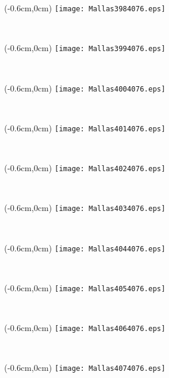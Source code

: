 \documentclass[12pt,letterpaper,oneside]{report}
\begin{document}
\begin{textblock*}{\paperwidth}(-0.6cm,0cm)
\texttt{[image: Mallas3984076.eps]}
\end{textblock*}

\ \pagebreak
\begin{textblock*}{\paperwidth}(-0.6cm,0cm)
\texttt{[image: Mallas3994076.eps]}
\end{textblock*}

\ \pagebreak
\begin{textblock*}{\paperwidth}(-0.6cm,0cm)
\texttt{[image: Mallas4004076.eps]}
\end{textblock*}

\ \pagebreak
\begin{textblock*}{\paperwidth}(-0.6cm,0cm)
\texttt{[image: Mallas4014076.eps]}
\end{textblock*}

\ \pagebreak
\begin{textblock*}{\paperwidth}(-0.6cm,0cm)
\texttt{[image: Mallas4024076.eps]}
\end{textblock*}

\ \pagebreak
\begin{textblock*}{\paperwidth}(-0.6cm,0cm)
\texttt{[image: Mallas4034076.eps]}
\end{textblock*}

\ \pagebreak
\begin{textblock*}{\paperwidth}(-0.6cm,0cm)
\texttt{[image: Mallas4044076.eps]}
\end{textblock*}

\ \pagebreak
\begin{textblock*}{\paperwidth}(-0.6cm,0cm)
\texttt{[image: Mallas4054076.eps]}
\end{textblock*}

\ \pagebreak
\begin{textblock*}{\paperwidth}(-0.6cm,0cm)
\texttt{[image: Mallas4064076.eps]}
\end{textblock*}

\ \pagebreak
\begin{textblock*}{\paperwidth}(-0.6cm,0cm)
\texttt{[image: Mallas4074076.eps]}
\end{textblock*}
\end{document}
